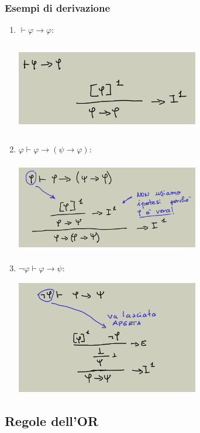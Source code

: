 \documentclass[a4paper,12pt]{report}
\begin{document}
\subsubsection{Esempi di derivazione}
\begin{enumerate}
\item $\vdash \varphi \to \varphi$:
\begin{center}
\includegraphics[width=8cm, height=4cm]{example1}
\end{center}
\item $\varphi \vdash \varphi \to (\psi \to \varphi)$:
\begin{center}
\includegraphics[width=8cm, height=4cm]{example2}
\end{center}
\item $\neg\varphi \vdash \varphi \to \psi$:
\begin{center}
\includegraphics[width=8cm, height=5cm]{example3}
\end{center}
\end{enumerate}

\subsection{Regole dell'OR}
\end{document}
